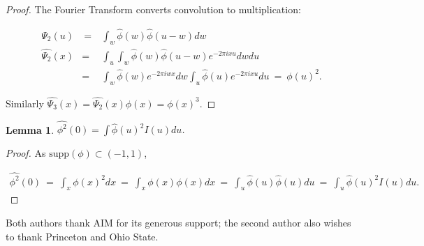 \documentclass{compositio}
\newcommand\bp{\begin{proof}}
\newcommand\ep{\end{proof}}
\newcommand\bea{\begin{eqnarray}}
\newcommand\eea{\end{eqnarray}}
\newtheorem{lem}[thm]{Lemma}
\newcommand{\hphi}{\widehat{\phi}}  %
\begin{document}
\bp The Fourier Transform converts convolution to multiplication:

\bea \Psi_2(u) & \ = \ & \int_w \hphi(w) \hphi(u-w)dw \nonumber\\
\widehat{\Psi_2}(x) & = & \int_u \int_w \hphi(w) \hphi(u-w)
e^{-2\pi i xu} dwdu \nonumber\\& = & \int_w \hphi(w) e^{-2\pi i
wx} dw \int_u \hphi(u) e^{-2\pi i xu}du \ = \ \phi(u)^2. \eea

Similarly $\widehat{\Psi_3}(x) = \widehat{\Psi_2}(x)\phi(x) =
\phi(x)^3$. \ep

\begin{lem}\label{lemwidehatphisquaredzero} $\widehat{\phi^2}(0) = \int \hphi(u)^2 I(u)du$.
\end{lem}

\bp As $\mbox{supp}(\phi) \subset (-1,1)$,

\bea \widehat{\phi^2}(0) \ = \ \int_x \phi(x)^2 dx  \ = \ \int_x
\phi(x) \phi(x) dx  \ = \ \int_u \hphi(u) \hphi(u)du  \ = \ \int_u
\hphi(u)^2 I(u)du. \eea \ep


\begin{acknowledgements}
Both authors thank AIM for its generous support; the second author
also wishes to thank Princeton and Ohio State.
\end{acknowledgements}
\end{document}
